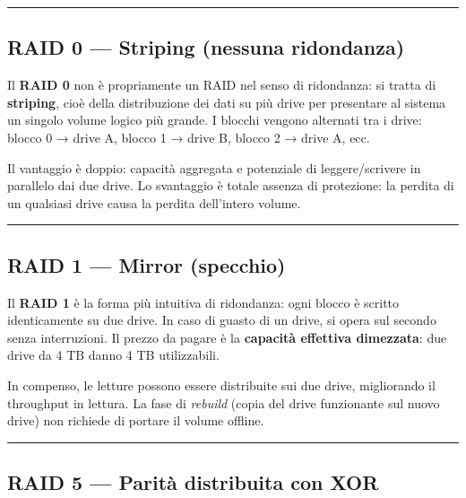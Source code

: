 \documentclass[
  italian,
  openany]{book}
\begin{document}
\begin{center}\rule{0.5\linewidth}{0.5pt}\end{center}

\subsection{RAID 0 --- Striping (nessuna
ridondanza)}\label{raid-0-striping-nessuna-ridondanza}

Il \textbf{RAID 0} non è propriamente un RAID nel senso di ridondanza:
si tratta di \textbf{striping}, cioè della distribuzione dei dati su più
drive per presentare al sistema un singolo volume logico più grande. I
blocchi vengono alternati tra i drive: blocco 0 → drive A, blocco 1 →
drive B, blocco 2 → drive A, ecc.

Il vantaggio è doppio: capacità aggregata e potenziale di
leggere/scrivere in parallelo dai due drive. Lo svantaggio è totale
assenza di protezione: la perdita di un qualsiasi drive causa la perdita
dell'intero volume.

\begin{center}\rule{0.5\linewidth}{0.5pt}\end{center}

\subsection{RAID 1 --- Mirror (specchio)}\label{raid-1-mirror-specchio}

Il \textbf{RAID 1} è la forma più intuitiva di ridondanza: ogni blocco è
scritto identicamente su due drive. In caso di guasto di un drive, si
opera sul secondo senza interruzioni. Il prezzo da pagare è la
\textbf{capacità effettiva dimezzata}: due drive da 4 TB danno 4 TB
utilizzabili.

In compenso, le letture possono essere distribuite sui due drive,
migliorando il throughput in lettura. La fase di \emph{rebuild} (copia
del drive funzionante sul nuovo drive) non richiede di portare il volume
offline.

\begin{center}\rule{0.5\linewidth}{0.5pt}\end{center}

\subsection{RAID 5 --- Parità distribuita con
XOR}\label{raid-5-parituxe0-distribuita-con-xor}
\end{document}
